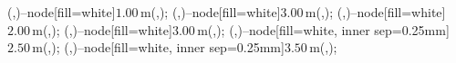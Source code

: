 {{		\small

		 (\QQx,\Ay)--node[fill=white]{$1.00\,$m}(\QQx,\By);
		 (\QQx,\By)--node[fill=white]{$3.00\,$m}(\QQx,\Cy);
		 (\Qx,\Ey)--node[fill=white]{$2.00\,$m}(\Qx,\Dy);
		 (\Qx,\Dy)--node[fill=white]{$3.00\,$m}(\Qx,\Cy);
		 (\Cx,\Py)--node[fill=white, inner sep=0.25mm]{$2.50\,$m}(\Ex,\Py);
		 (\Cx,\Py)--node[fill=white, inner sep=0.25mm]{$3.50\,$m}(\Ax,\Py);



	}
}
